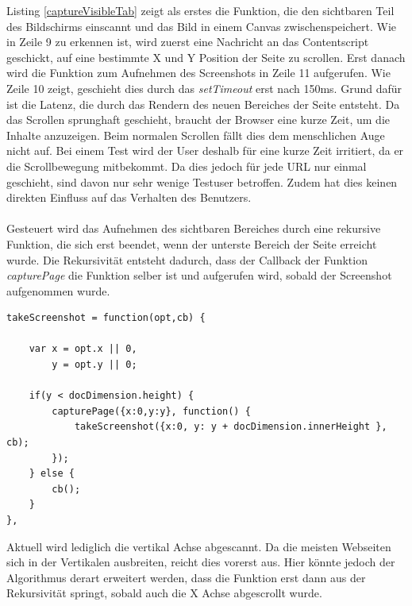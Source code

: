 Listing \ref{captureVisibleTab} zeigt als erstes die Funktion, die den sichtbaren Teil des Bildschirms einscannt und das Bild in einem Canvas zwischenspeichert. Wie in Zeile 9 zu erkennen ist, wird zuerst eine Nachricht an das Contentscript geschickt, auf eine bestimmte X und Y Position der Seite zu scrollen. Erst danach wird die Funktion zum Aufnehmen des Screenshots in Zeile 11 aufgerufen. Wie Zeile 10 zeigt, geschieht dies durch das \textit{setTimeout} erst nach 150ms. Grund dafür ist die Latenz, die durch das Rendern des neuen Bereiches der Seite entsteht. Da das Scrollen sprunghaft geschieht, braucht der Browser eine kurze Zeit, um die Inhalte anzuzeigen. Beim normalen Scrollen fällt dies dem menschlichen Auge nicht auf. Bei einem Test wird der User deshalb für eine kurze Zeit irritiert, da er die Scrollbewegung mitbekommt. Da dies jedoch für jede URL nur einmal geschieht, sind davon nur sehr wenige Testuser betroffen. Zudem hat dies keinen direkten Einfluss auf das Verhalten des Benutzers.\\
\\
Gesteuert wird das Aufnehmen des sichtbaren Bereiches durch eine rekursive Funktion, die sich erst beendet, wenn der unterste Bereich der Seite erreicht wurde. Die Rekursivität entsteht dadurch, dass der Callback der Funktion \textit{capturePage} die Funktion selber ist und aufgerufen wird, sobald der Screenshot aufgenommen wurde.
\\
\begin{lstlisting}[caption=Rekursive Funktion die das Abscannen der Seite steuert,label=takeScreenshot]
takeScreenshot = function(opt,cb) {

    var x = opt.x || 0,
        y = opt.y || 0;

    if(y < docDimension.height) {
        capturePage({x:0,y:y}, function() {
            takeScreenshot({x:0, y: y + docDimension.innerHeight }, cb);
        });
    } else {
        cb();
    }
},
\end{lstlisting}
\vspace{0,5cm}

Aktuell wird lediglich die vertikal Achse abgescannt. Da die meisten Webseiten sich in der Vertikalen ausbreiten, reicht dies vorerst aus. Hier könnte jedoch der Algorithmus derart erweitert werden, dass die Funktion erst dann aus der Rekursivität springt, sobald auch die X Achse abgescrollt wurde.
